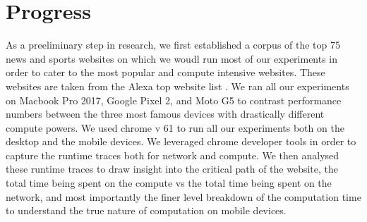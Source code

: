 \section{Progress}
\label{sec:Progress}

As a preeliminary step in research, we first established a corpus of
the top 75 news and sports websites on which we woudl run most of our
experiments in order to cater to the most popular and compute
intensive websites.  These websites are taken from the Alexa top
website list \cite{}.  We ran all our experiments on Macbook Pro 2017,
Google Pixel 2, and Moto G5 to contrast performance numbers between
the three most famous devices with drastically different compute
powers. We used chrome v 61 to run all  our experiments both on the
desktop and the mobile devices. We leveraged chrome developer tools in
order to capture the runtime traces both for network and compute. We
then analysed these runtime traces to draw insight into the critical
path of the website, the total time being spent on the compute vs the
total time being spent on the network, and most importantly the finer
level breakdown of the computation time to understand the true nature
of computation on mobile devices. 

